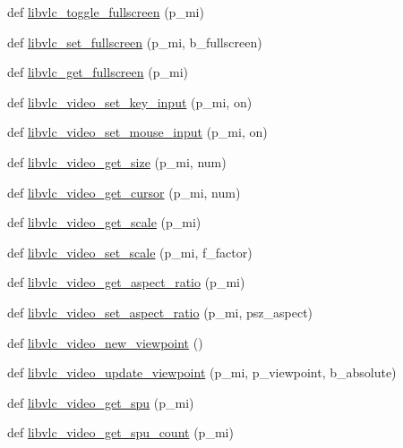 \begin{DoxyCompactItemize}
\item 
def \hyperlink{namespacevlc_a370780527977cf3a710b9c542f88b0aa}{libvlc\+\_\+toggle\+\_\+fullscreen} (p\+\_\+mi)
\item 
def \hyperlink{namespacevlc_a22a30fc3b5a348e7363b5ad4dba42564}{libvlc\+\_\+set\+\_\+fullscreen} (p\+\_\+mi, b\+\_\+fullscreen)
\item 
def \hyperlink{namespacevlc_a9533bb014114561474c90a91497dc7d6}{libvlc\+\_\+get\+\_\+fullscreen} (p\+\_\+mi)
\item 
def \hyperlink{namespacevlc_a76625220c6c679321e8b22df8a1070d1}{libvlc\+\_\+video\+\_\+set\+\_\+key\+\_\+input} (p\+\_\+mi, on)
\item 
def \hyperlink{namespacevlc_a441b6e87f5bb7c378d9c47250ab21607}{libvlc\+\_\+video\+\_\+set\+\_\+mouse\+\_\+input} (p\+\_\+mi, on)
\item 
def \hyperlink{namespacevlc_a58dd475be13d1393cc878b2dd94df81a}{libvlc\+\_\+video\+\_\+get\+\_\+size} (p\+\_\+mi, num)
\item 
def \hyperlink{namespacevlc_a228937b07392d999417491489e90f7f0}{libvlc\+\_\+video\+\_\+get\+\_\+cursor} (p\+\_\+mi, num)
\item 
def \hyperlink{namespacevlc_a28d5c283978b730a725f3a892f93ba7f}{libvlc\+\_\+video\+\_\+get\+\_\+scale} (p\+\_\+mi)
\item 
def \hyperlink{namespacevlc_afd16d3990030b2fa33195d13e9c0bb27}{libvlc\+\_\+video\+\_\+set\+\_\+scale} (p\+\_\+mi, f\+\_\+factor)
\item 
def \hyperlink{namespacevlc_ae8a30662bf8336cac0e165ab5eac932a}{libvlc\+\_\+video\+\_\+get\+\_\+aspect\+\_\+ratio} (p\+\_\+mi)
\item 
def \hyperlink{namespacevlc_a34236e9eeb606f47fe5fc1f183ff28f8}{libvlc\+\_\+video\+\_\+set\+\_\+aspect\+\_\+ratio} (p\+\_\+mi, psz\+\_\+aspect)
\item 
def \hyperlink{namespacevlc_ae66cd567ec307d388c3faa3a303ff70e}{libvlc\+\_\+video\+\_\+new\+\_\+viewpoint} ()
\item 
def \hyperlink{namespacevlc_a3950e442a1f8e253586957f4e0c7dcd0}{libvlc\+\_\+video\+\_\+update\+\_\+viewpoint} (p\+\_\+mi, p\+\_\+viewpoint, b\+\_\+absolute)
\item 
def \hyperlink{namespacevlc_ae6db3de1105a1c4365693745b2517c7d}{libvlc\+\_\+video\+\_\+get\+\_\+spu} (p\+\_\+mi)
\item 
def \hyperlink{namespacevlc_aa022f0d518cb2fbf8f6601ee2489570a}{libvlc\+\_\+video\+\_\+get\+\_\+spu\+\_\+count} (p\+\_\+mi)
\item 

\end{DoxyCompactItemize}
